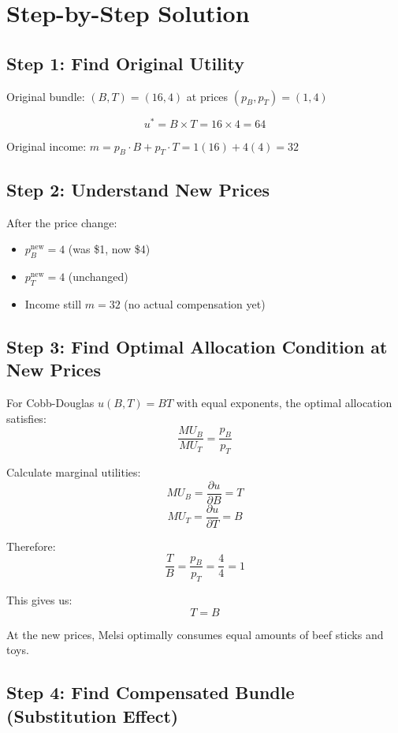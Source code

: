 \documentclass[11pt]{article}
\begin{document}
\section{Step-by-Step Solution}

\subsection{Step 1: Find Original Utility}

Original bundle: $(B, T) = (16, 4)$ at prices $(p_B, p_T) = (1, 4)$

$$u^* = B \times T = 16 \times 4 = 64$$

Original income: $m = p_B \cdot B + p_T \cdot T = 1(16) + 4(4) = 32$

\subsection{Step 2: Understand New Prices}

After the price change:
\begin{itemize}
    \item $p_B^{\text{new}} = 4$ (was \$1, now \$4)
    \item $p_T^{\text{new}} = 4$ (unchanged)
    \item Income still $m = 32$ (no actual compensation yet)
\end{itemize}

\subsection{Step 3: Find Optimal Allocation Condition at New Prices}

For Cobb-Douglas $u(B, T) = BT$ with equal exponents, the optimal allocation satisfies:
$$\frac{MU_B}{MU_T} = \frac{p_B}{p_T}$$

Calculate marginal utilities:
$$MU_B = \frac{\partial u}{\partial B} = T$$
$$MU_T = \frac{\partial u}{\partial T} = B$$

Therefore:
$$\frac{T}{B} = \frac{p_B}{p_T} = \frac{4}{4} = 1$$

This gives us:
$$\boxed{T = B}$$

At the new prices, Melsi optimally consumes equal amounts of beef sticks and toys.

\subsection{Step 4: Find Compensated Bundle (Substitution Effect)}
\end{document}
